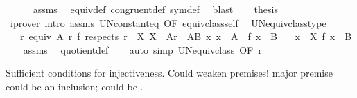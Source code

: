 \begin{isabellebody}
\ \ \ \ \isamarkupfalse%
\ assms\ \isamarkupfalse%
\ equiv{\isacharunderscore}{\kern0pt}def\ congruent{\isacharunderscore}{\kern0pt}def\ sym{\isacharunderscore}{\kern0pt}def\ \isamarkupfalse%
\ blast\isanewline
\ \ \isamarkupfalse%
\ {\isacharquery}{\kern0pt}thesis\isanewline
\ \ \ \ \isamarkupfalse%
\ {\isacharparenleft}{\kern0pt}iprover\ intro{\isacharcolon}{\kern0pt}\ assms\ UN{\isacharunderscore}{\kern0pt}constant{\isacharunderscore}{\kern0pt}eq\ {\isacharbrackleft}{\kern0pt}OF\ equiv{\isacharunderscore}{\kern0pt}class{\isacharunderscore}{\kern0pt}self\ {\isasymsection}{\isacharbrackright}{\kern0pt}{\isacharparenright}{\kern0pt}\isanewline
{}\isamarkupfalse%
%
\endisatagproof
{\isafoldproof}%
%
\isadelimproof
\isanewline
%
\endisadelimproof
\isanewline
{}\isamarkupfalse%
\ UN{\isacharunderscore}{\kern0pt}equiv{\isacharunderscore}{\kern0pt}class{\isacharunderscore}{\kern0pt}type{\isacharcolon}{\kern0pt}\isanewline
\ \ \ r{\isacharcolon}{\kern0pt}\ {\isachardoublequoteopen}equiv\ A\ r{\isachardoublequoteclose}\ {\isachardoublequoteopen}f\ respects\ r{\isachardoublequoteclose}\ \ X{\isacharcolon}{\kern0pt}\ {\isachardoublequoteopen}X\ {\isasymin}\ A{\isacharslash}{\kern0pt}{\isacharslash}{\kern0pt}r{\isachardoublequoteclose}\ \ AB{\isacharcolon}{\kern0pt}\ {\isachardoublequoteopen}{\isasymAnd}x{\isachardot}{\kern0pt}\ x\ {\isasymin}\ A\ {\isasymLongrightarrow}\ f\ x\ {\isasymin}\ B{\isachardoublequoteclose}\isanewline
\ \ \ {\isachardoublequoteopen}{\isacharparenleft}{\kern0pt}{\isasymUnion}x\ {\isasymin}\ X{\isachardot}{\kern0pt}\ f\ x{\isacharparenright}{\kern0pt}\ {\isasymin}\ B{\isachardoublequoteclose}\isanewline
%
\isadelimproof
\ \ %
\endisadelimproof
%
\isatagproof
{}\isamarkupfalse%
\ assms\ \isamarkupfalse%
\ quotient{\isacharunderscore}{\kern0pt}def\isanewline
\ \ \isamarkupfalse%
\ {\isacharparenleft}{\kern0pt}auto\ simp{\isacharcolon}{\kern0pt}\ UN{\isacharunderscore}{\kern0pt}equiv{\isacharunderscore}{\kern0pt}class\ {\isacharbrackleft}{\kern0pt}OF\ r{\isacharbrackright}{\kern0pt}{\isacharparenright}{\kern0pt}%
\endisatagproof
{\isafoldproof}%
%
\isadelimproof
%
\endisadelimproof
%
\begin{isamarkuptext}%
Sufficient conditions for injectiveness.  Could weaken premises!
  major premise could be an inclusion;  could be
  .%

\end{isamarkuptext}
\end{isabellebody}
